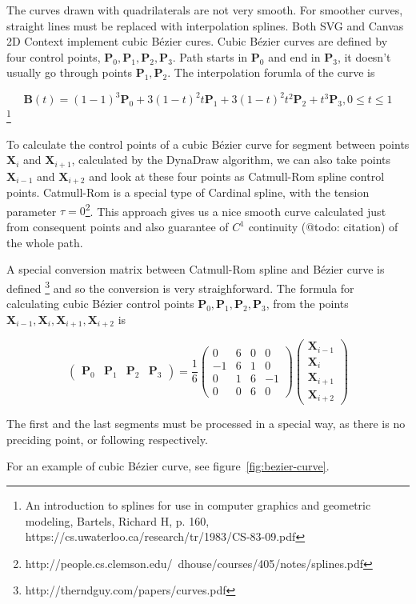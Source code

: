 The curves drawn with quadrilaterals are not very smooth. For smoother curves, straight lines must be replaced with interpolation splines. Both SVG and Canvas 2D Context implement cubic Bézier cures. Cubic Bézier curves are defined by four control points, $ \mathbf{P}_0, \mathbf{P}_1, \mathbf{P}_2, \mathbf{P}_3 $. Path starts in $ \mathbf{P}_0 $ and end in $ \mathbf{P}_3 $, it doesn't usually go through points $ \mathbf{P}_1, \mathbf{P}_2 $. The interpolation forumla of the curve is

$$ \mathbf{B}(t) = (1 - 1)^3 \mathbf{P}_0 + 3(1-t)^{2}t\mathbf{P}_1 + 3(1-t)^{2}t^2\mathbf{P}_2 + t^3\mathbf{P}_3, 0 \leq t \leq 1$$ \cite{}\footnote{An introduction to splines for use in computer graphics and geometric modeling, Bartels, Richard H, p. 160, https://cs.uwaterloo.ca/research/tr/1983/CS-83-09.pdf}

To calculate the control points of a cubic Bézier curve for segment between points $\mathbf{X}_i$ and $\mathbf{X}_{i+1}$, calculated by the DynaDraw algorithm, we can also take points $\mathbf{X}_{i-1}$ and $\mathbf{X}_{i+2}$ and look at these four points as Catmull-Rom spline control points. Catmull-Rom is a special type of Cardinal spline, with the tension parameter $\tau = 0$\cite{}\footnote{http://people.cs.clemson.edu/~dhouse/courses/405/notes/splines.pdf}. This approach gives us a nice smooth curve calculated just from consequent points and also guarantee of $C^1$ continuity (@todo: citation) of the whole path.

A special conversion matrix between Catmull-Rom spline and Bézier curve is defined \cite{}\footnote{http://therndguy.com/papers/curves.pdf} and so the conversion is very straighforward. The formula for calculating cubic Bézier control points $ \mathbf{P}_0, \mathbf{P}_1, \mathbf{P}_2, \mathbf{P}_3 $, from the points $ \mathbf{X}_{i-1}, \mathbf{X}_i, \mathbf{X}_{i+1}, \mathbf{X}_{i+2} $ is

$$
\begin{pmatrix}\mathbf{P}_0 & \mathbf{P}_1 & \mathbf{P}_{2} & \mathbf{P}_{3} \end{pmatrix} = \frac{1}{6}\begin{pmatrix} 0 & 6 & 0 & 0 \\ -1 & 6 & 1 & 0 \\ 0 & 1 & 6 & -1 \\ 0 & 0 & 6 & 0 \end{pmatrix} \begin{pmatrix} \mathbf{X}_{i-1} \\ \mathbf{X}_i \\ \mathbf{X}_{i+1} \\ \mathbf{X}_{i+2} \end{pmatrix}
$$

The first and the last segments must be processed in a special way, as there is no preciding point, or following respectively. 

For an example of cubic Bézier curve, see figure~\ref{fig:bezier-curve}.